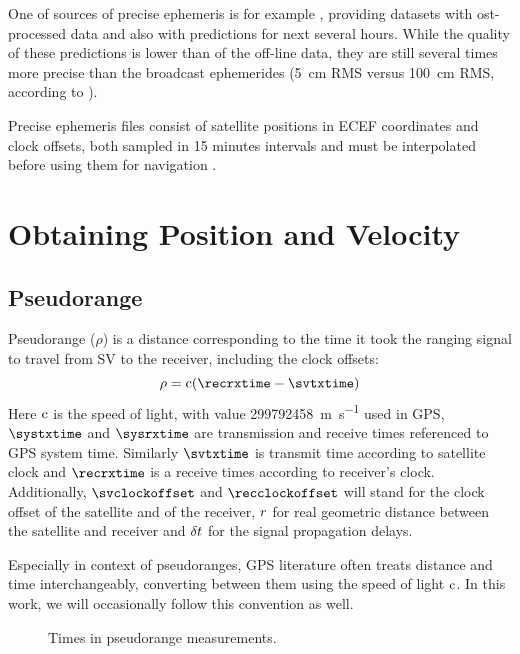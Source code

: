 One of sources of precise ephemeris is for example \cite{orbit-data}, providing datasets with
ost-processed data and also with predictions for next several hours.
While the quality of these predictions is lower than of the off-line data,
they are still several times more precise than the broadcast ephemerides
(\SI{5}{\centi\meter} RMS versus \SI{100}{\centi\meter} RMS, according to \cite{orbit-data}).

Precise ephemeris files consist of satellite positions in ECEF
coordinates and clock offsets, both sampled in 15 minutes intervals and must be interpolated
before using them for navigation \cite{schenewerk03}.

\section{Obtaining Position and Velocity}


\subsection{Pseudorange}
\label{sec:pseudorange}

Pseudorange (\(\rho\)) is a distance corresponding to the time it took the ranging
signal to travel from SV to the receiver, including the clock offsets:
\begin{equation}
	\label{eq:pseudorange}
	\rho = \speedoflight (\recrxtime - \svtxtime)
\end{equation}
Here \(\mathrm{c}\) is the speed of light, with value \SI{299792458}{\meter\per\second} used in GPS,
\(\systxtime\) and \(\sysrxtime\) are transmission and receive times referenced to GPS system time.
Similarly \(\svtxtime\) is transmit time according to satellite clock and
\(\recrxtime\) is a receive times according to receiver's clock.
Additionally, \(\svclockoffset\) and \(\recclockoffset\) will stand for the clock offset of the satellite
and of the receiver, \(r\) for real geometric distance between the satellite and receiver
and \(\delta{t}\) for the signal propagation delays.

Especially in context of pseudoranges, GPS literature often treats distance and time
interchangeably, converting between them using the speed of light \(\mathrm{c}\).
In this work, we will occasionally follow this convention as well.

\begin{figure}[tb]
	\centering
	
	\caption{Times in pseudorange measurements.}
	\label{fig:pseudorange}
\end{figure}

